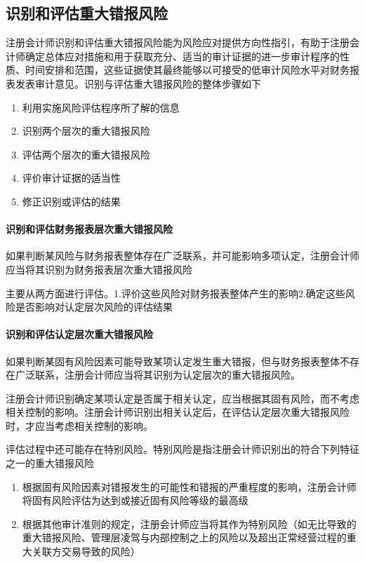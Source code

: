 \documentclass[UTF8,12pt]{ctexart}
\numberwithin{equation}{section} %
\numberwithin{figure}{section}
\numberwithin{table}{section}
\begin{document}
	\subsection{识别和评估重大错报风险}
	注册会计师识别和评估重大错报风险能为风险应对提供方向性指引，有助于注册会计师确定总体应对措施和用于获取充分、适当的审计证据的进一步审计程序的性质、时间安排和范围，这些证据使其最终能够以可接受的低审计风险水平对财务报表发表审计意见。识别与评估重大错报风险的整体步骤如下
	\begin{enumerate}
		\item 利用实施风险评估程序所了解的信息
		
		\item 识别两个层次的重大错报风险
		
		\item 评估两个层次的重大错报风险
		
		\item 评价审计证据的适当性
		
		\item 修正识别或评估的结果
	\end{enumerate}
	
	\paragraph{识别和评估财务报表层次重大错报风险}
	如果判断某风险与财务报表整体存在广泛联系，并可能影响多项认定，注册会计师应当将其识别为财务报表层次重大错报风险
	
	主要从两方面进行评估。1.评价这些风险对财务报表整体产生的影响2.确定这些风险是否影响对认定层次风险的评估结果
	
	\paragraph{识别和评估认定层次重大错报风险}
	如果判断某固有风险因素可能导致某项认定发生重大错报，但与财务报表整体不存在广泛联系，注册会计师应当将其识别为认定层次的重大错报风险。
	
	注册会计师识别确定某项认定是否属于相关认定，应当根据其固有风险，而不考虑相关控制的影响。注册会计师识别出相关认定后，在评估认定层次重大错报风险时，才应当考虑相关控制的影响。
	
	评估过程中还可能存在特别风险。特别风险是指注册会计师识别出的符合下列特征之一的重大错报风险
	\begin{enumerate}
		\item 根据固有风险因素对错报发生的可能性和错报的严重程度的影响，注册会计师将固有风险评估为达到或接近固有风险等级的最高级
		
		\item 根据其他审计准则的规定，注册会计师应当将其作为特别风险（如无比导致的重大错报风险、管理层凌驾与内部控制之上的风险以及超出正常经营过程的重大关联方交易导致的风险）
	\end{enumerate}
	
\end{document}
